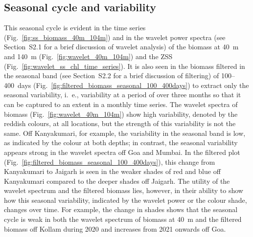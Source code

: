 \documentclass[authoryear,review,11pt]{elsarticle}
\newcommand{\chla}{chl-{\emph{a}}}
\begin{document}
%


\subsection{Seasonal cycle and variability}
\label{sec:seasonal.zss}

This seasonal cycle is evident in the time series (Fig.~\ref{fig:ss_biomass_40m_104m}) and in the wavelet power spectra (see Section~S2.1 for a brief discussion of wavelet analysis) of the biomass at 40~m and 140~m (Fig.~\ref{fig:wavelet_40m_104m}) and the ZSS (Fig.~\ref{fig:wavelet_ss_chl_time_series}).  It is also seen in the biomass filtered in the seasonal band (see Section~S2.2 for a brief discussion of filtering) of 100--400~days (Fig.~\ref{fig:filtered_biomass_seasonal_100_400days}) to extract only the seasonal variability, i.~e., variability at a period of over three months so that it can be captured to an extent in a monthly time series.  The wavelet spectra of biomass (Fig.~\ref{fig:wavelet_40m_104m}) show high variability, denoted by the reddish colours, at all locations, but the strength of this variability is not the same.  Off Kanyakumari, for example, the variability in the seasonal band is low, as indicated by the colour at both depths; in contrast, the seasonal variability appears strong in the wavelet spectra off Goa and Mumbai.  In the filtered plot (Fig.~\ref{fig:filtered_biomass_seasonal_100_400days}), this change from Kanyakumari to Jaigarh is seen in the weaker shades of red and blue off Kanyakumari compared to the deeper shades off Jaigarh. The utility of the wavelet spectrum and the filtered biomass lies, however, in their ability to show how this seasonal variability, indicated by the wavelet power or the colour shade, changes over time.  For example, the change in shades shows that the seasonal cycle is weak in both the wavelet spectrum of biomass at 40~m and the filtered biomass off Kollam during 2020 and increases from 2021 onwards off Goa. 
\end{document}
